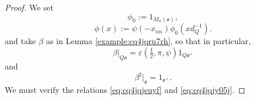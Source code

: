 \documentclass[reqno]{amsart}
\theoremstyle{plain}
\theoremstyle{definition}
\begin{document}
\begin{proof}
  We set
  \begin{equation*}
    \phi_0 := 1_{M_n(\mathfrak{o})},
  \end{equation*}
  \begin{equation}\label{eq:cq4jqv74tm}
    \phi(x) := \psi(- x_{nn}) \phi_0(x d_{Q}^{-1}).
  \end{equation}
  and take $\beta$ as in Lemma \ref{example:cq4jqru7rh}, so that in particular,
  \begin{equation}\label{eq:cq73v9ep9j}
    \beta|_{Q \mathfrak{o}} = \varepsilon(\tfrac{1}{2}, \pi, \psi) 1_{Q \mathfrak{o}^\times}
  \end{equation}
  and
  \begin{equation}\label{eq:cq73v91fxa}
    \beta^\sharp |_{\mathfrak{o}} = 1_{\mathfrak{o}^\times}.
  \end{equation}
  We must verify the relations \eqref{eq:cq4jqjeuyf} and \eqref{eq:cq4jqjy05j}.


\end{proof}
\end{document}
